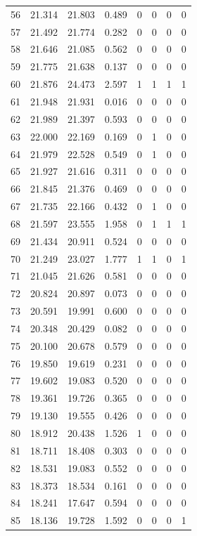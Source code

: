 \begin{longtable}{rrrrrrrr}
56 & 21.314 & 21.803 & 0.489 & 0 & 0 & 0 & 0\\
57 & 21.492 & 21.774 & 0.282 & 0 & 0 & 0 & 0\\
58 & 21.646 & 21.085 & 0.562 & 0 & 0 & 0 & 0\\
59 & 21.775 & 21.638 & 0.137 & 0 & 0 & 0 & 0\\
60 & 21.876 & 24.473 & 2.597 & 1 & 1 & 1 & 1\\
61 & 21.948 & 21.931 & 0.016 & 0 & 0 & 0 & 0\\
62 & 21.989 & 21.397 & 0.593 & 0 & 0 & 0 & 0\\
63 & 22.000 & 22.169 & 0.169 & 0 & 1 & 0 & 0\\
64 & 21.979 & 22.528 & 0.549 & 0 & 1 & 0 & 0\\
65 & 21.927 & 21.616 & 0.311 & 0 & 0 & 0 & 0\\
66 & 21.845 & 21.376 & 0.469 & 0 & 0 & 0 & 0\\
67 & 21.735 & 22.166 & 0.432 & 0 & 1 & 0 & 0\\
68 & 21.597 & 23.555 & 1.958 & 0 & 1 & 1 & 1\\
69 & 21.434 & 20.911 & 0.524 & 0 & 0 & 0 & 0\\
70 & 21.249 & 23.027 & 1.777 & 1 & 1 & 0 & 1\\
71 & 21.045 & 21.626 & 0.581 & 0 & 0 & 0 & 0\\
72 & 20.824 & 20.897 & 0.073 & 0 & 0 & 0 & 0\\
73 & 20.591 & 19.991 & 0.600 & 0 & 0 & 0 & 0\\
74 & 20.348 & 20.429 & 0.082 & 0 & 0 & 0 & 0\\
75 & 20.100 & 20.678 & 0.579 & 0 & 0 & 0 & 0\\
76 & 19.850 & 19.619 & 0.231 & 0 & 0 & 0 & 0\\
77 & 19.602 & 19.083 & 0.520 & 0 & 0 & 0 & 0\\
78 & 19.361 & 19.726 & 0.365 & 0 & 0 & 0 & 0\\
79 & 19.130 & 19.555 & 0.426 & 0 & 0 & 0 & 0\\
80 & 18.912 & 20.438 & 1.526 & 1 & 0 & 0 & 0\\
81 & 18.711 & 18.408 & 0.303 & 0 & 0 & 0 & 0\\
82 & 18.531 & 19.083 & 0.552 & 0 & 0 & 0 & 0\\
83 & 18.373 & 18.534 & 0.161 & 0 & 0 & 0 & 0\\
84 & 18.241 & 17.647 & 0.594 & 0 & 0 & 0 & 0\\
85 & 18.136 & 19.728 & 1.592 & 0 & 0 & 0 & 1\\

\end{longtable}
